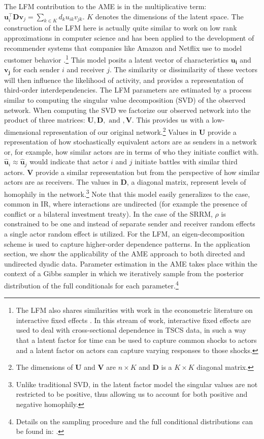 \documentclass[12pt]{amsart}
\begin{document}
The LFM contribution to the AME is in the multiplicative term: $\mathbf{u}_{i}^{\top} \mathbf{D} \mathbf{v}_{j}=\sum_{k \in K} d_{k} u_{ik} v_{jk}$. $K$ denotes the dimensions of the latent space. The construction of the LFM here is actually quite similar to work on low rank approximations in computer science and has been applied to the development of recommender systems that companies like Amazon and Netflix use to model customer behavior \citep{resnick:varian:1997,bennett:lanning:2007}.\footnote{The LFM also shares similarities with work in the econometric literature on interactive fixed effects \citep{bai:2009,pang:2014}. In this stream of work, interactive fixed effects are used to deal with cross-sectional dependence in TSCS data, in such a way that a latent factor for time can be used to capture common shocks to actors and a latent factor on actors can capture varying responses to those shocks.} This model posits a latent vector of characteristics
$\mathbf{u_{i}}$ and $\mathbf{v_{j}}$ for each sender $i$ and receiver $j$. The similarity or dissimilarity of these vectors will then influence the likelihood of activity, and provides a representation of third-order interdependencies. The LFM parameters are estimated by a process similar to computing the singular value decomposition (SVD) of the observed network. When computing the SVD we factorize our observed network into the product of three matrices: $\mathbf{U}, \mathbf{D}, \text{ and }, \mathbf{V}$. This provides us with a low-dimensional representation of our original network.\footnote{The dimensions of $\mathbf{U}$ and $\mathbf{V}$ are $n \times K$ and $\mathbf{D}$ is a $K \times K$ diagonal matrix.} Values in $\mathbf{U}$ provide a representation of how stochastically equivalent actors are as senders in a network or, for example, how similar actors are in terms of who they initiate conflict with. $\hat{\mathbf{u}}_{i} \approx \hat{\mathbf{u}}_{j}$ would indicate that actor $i$ and $j$ initiate battles with similar third actors. $\mathbf{V}$ provide a similar representation but from the perspective of how similar actors are as receivers. The values in $\mathbf{D}$, a diagonal matrix, represent levels of homophily in the network.\footnote{Unlike traditional SVD, in the latent factor model the singular values are not restricted to be positive, thus allowing us to account for both positive and negative homophily.} Note that this model easily generalizes to the case, common in IR, where interactions are undirected (for example the presence of conflict or a bilateral investment treaty). In the case of the SRRM, $\rho$ is constrained to be one and instead of separate sender and receiver random effects a single actor random effect is utilized. For the LFM, an eigen-decomposition scheme is used to capture higher-order dependence patterns. In the application section, we show the applicability of the AME approach to both directed and undirected dyadic data. Parameter estimation in the AME takes place within the context of a Gibbs sampler in which we iteratively sample from the posterior distribution of the full conditionals for each parameter.\footnote{Details on the sampling procedure and the full conditional distributions can be found in: \citet{hoff:2005,hoff:2008,minhas:etal:2019,hoff:2021}.}
\end{document}
